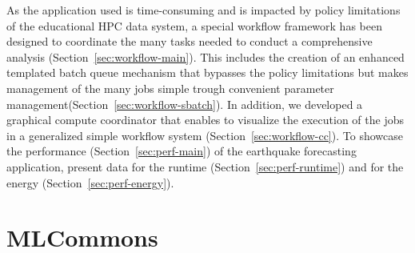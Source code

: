 \documentclass[utf8]{FrontiersinVancouver} %
\begin{document}
As the application used is time-consuming and is impacted by policy
limitations of the educational HPC data system, a special workflow
framework has been designed to coordinate the many tasks needed to
conduct a comprehensive analysis
(Section~\ref{sec:workflow-main}). This includes the creation of an
enhanced templated batch queue mechanism that bypasses the policy
limitations but makes management of the many jobs simple trough
convenient parameter management(Section~\ref{sec:workflow-sbatch}). In
addition, we developed a graphical compute coordinator that enables to
visualize the execution of the jobs in a generalized simple workflow
system (Section~\ref{sec:workflow-cc}).  To showcase the performance
(Section~\ref{sec:perf-main}) of the earthquake forecasting
application, present data for the runtime
(Section~\ref{sec:perf-runtime}) and for the energy
(Section~\ref{sec:perf-energy}).


\section{MLCommons}
\label{sec:mlcommons}
\end{document}
